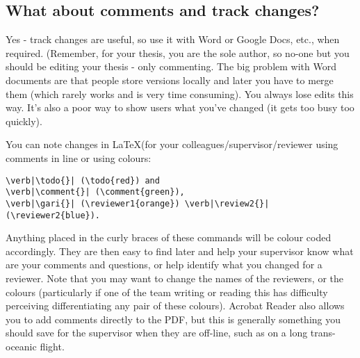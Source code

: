\subsection{What about comments and track changes?}
Yes - track changes are useful, so use it with Word or Google Docs, etc., when
required. (Remember, for your thesis, you are the sole author, so no-one but you should be editing your thesis - only commenting. %
The big problem with Word documents are that people store versions locally and later you have to merge them (which rarely works and is very time consuming). You always lose edits this way. It's also a poor way to show users what you've changed (it gets too busy too quickly). 

You can note changes in \LaTeX (for your colleagues/supervisor/reviewer using comments in line or using colours:
\begin{verbatim}
\verb|\todo{}| (\todo{red}) and 
\verb|\comment{}| (\comment{green}), 
\verb|\gari{}| (\reviewer1{orange}) \verb|\review2{}| (\reviewer2{blue}). 
\end{verbatim}
Anything placed in the 
curly braces of these commands will be colour coded accordingly.
They are then easy to find later and help your supervisor know what are your comments and questions, or help identify what you changed for a reviewer. 
Note that you may want to change 
the names of the reviewers, or the colours (particularly if one
of the team writing or reading this has difficulty perceiving 
differentiating any pair of these colours). 
Acrobat Reader also allows you to add comments directly to the PDF, but this is generally something you should save for the supervisor when they are off-line, such as on a long trans-oceanic flight.



